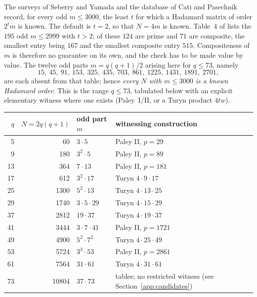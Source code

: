 \documentclass[11pt]{article}
\begin{document}
The surveys of Seberry and Yamada \cite{SeberryYamada1992,
SeberryYamada2020} and the database of Cati and Pasechnik
\cite{CatiPasechnik2024} record, for every odd \(m\le 3000\), the least
\(t\) for which a Hadamard matrix of order \(2^{t}m\) is known.  The
default is \(t=2\), so that \(N=4m\) is known.  Table~4 of
\cite{CatiPasechnik2024} lists the \(195\) odd \(m\le2999\) with
\(t>2\); of these \(124\) are prime and \(71\) are composite, the
smallest entry being \(167\) and the smallest composite entry \(515\).
Compositeness of \(m\) is therefore no guarantee on its own, and the
check has to be made value by value.  The twelve odd parts
\(m=q(q+1)/2\) arising here for \(q\le73\), namely
\[
        15,\ 45,\ 91,\ 153,\ 325,\ 435,\ 703,\ 861,\ 1225,\ 1431,\ 1891,\ 2701,
\]
are each absent from that table; hence \emph{every \(N\) with
\(m\le3000\) is a known Hadamard order}.
This is the range \(q\le73\), tabulated below with an explicit
elementary witness where one exists (Paley~I/II, or a Turyn product
\(4tw\)).

\begin{center}
\begin{tabular}{r r l l}
\(q\) & \(N=2q(q+1)\) & odd part \(m\) & witnessing construction\\\hline
5  & 60    & \(3\cdot5\)        & Paley II, \(p=29\)\\
9  & 180   & \(3^{2}\cdot5\)    & Paley II, \(p=89\)\\
13 & 364   & \(7\cdot13\)       & Paley II, \(p=181\)\\
17 & 612   & \(3^{2}\cdot17\)   & Turyn \(4\cdot9\cdot17\)\\
25 & 1300  & \(5^{2}\cdot13\)   & Turyn \(4\cdot13\cdot25\)\\
29 & 1740  & \(3\cdot5\cdot29\) & Turyn \(4\cdot15\cdot29\)\\
37 & 2812  & \(19\cdot37\)      & Turyn \(4\cdot19\cdot37\)\\
41 & 3444  & \(3\cdot7\cdot41\) & Paley II, \(p=1721\)\\
49 & 4900  & \(5^{2}\cdot7^{2}\)& Turyn \(4\cdot25\cdot49\)\\
53 & 5724  & \(3^{3}\cdot53\)   & Paley II, \(p=2861\)\\
61 & 7564  & \(31\cdot61\)      & Turyn \(4\cdot31\cdot61\)\\
73 & 10804 & \(37\cdot73\)      & tables; no restricted witness (see Section~\ref{app:candidates})\\
\end{tabular}
\end{center}
\end{document}
